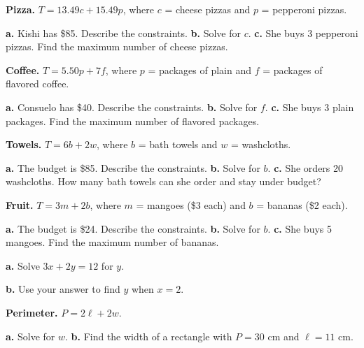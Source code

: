 \documentclass[11pt,a4paper]{article}
\newenvironment{FRQGrid}{%
  \begin{tcbraster}[raster columns=2,raster equal height=rows,raster column skip=4mm,
    raster row skip=3mm]}{\end{tcbraster}}
\begin{document}
\begin{FRQGrid}
\begin{FRQ}[fontupper=\small,qsource={Textbook · p.\,120 Ex. 4},qlevel=2,lines=3,final={6 cheese/5 pepperoni max; $c=\frac{T-15.49p}{13.49}$; 2}]
  \textbf{Pizza.} $T=13.49c+15.49p$, where $c$ = cheese pizzas and $p$ = pepperoni pizzas.\par
  \textbf{a.} Kishi has \$85. Describe the constraints.\quad
  \textbf{b.} Solve for $c$.\quad
  \textbf{c.} She buys 3 pepperoni pizzas. Find the maximum number of cheese pizzas.
\end{FRQ}
\begin{FRQ}[fontupper=\small,qsource={Textbook · p.\,126 Ex. 23},qlevel=2,lines=3,final={7 plain/5 flavored max; $f=\frac{T-5.50p}{7}$; 3}]
  \textbf{Coffee.} $T=5.50p+7f$, where $p$ = packages of plain and $f$ = packages of flavored coffee.\par
  \textbf{a.} Consuelo has \$40. Describe the constraints.\quad
  \textbf{b.} Solve for $f$.\quad
  \textbf{c.} She buys 3 plain packages. Find the maximum number of flavored packages.
\end{FRQ}
\begin{FRQ}[fontupper=\small,qsource={Textbook · p.\,126 Ex. 24},qlevel=2,lines=3,final={14 towels/42 washcloths max; $b=\frac{T-2w}{6}$; 7}]
  \textbf{Towels.} $T=6b+2w$, where $b$ = bath towels and $w$ = washcloths.\par
  \textbf{a.} The budget is \$85. Describe the constraints.\quad
  \textbf{b.} Solve for $b$.\quad
  \textbf{c.} She orders 20 washcloths. How many bath towels can she order and stay under budget?
\end{FRQ}
\begin{FRQ}[fontupper=\small,qlevel=2,lines=3,final={8 mangoes/12 bananas max; $b=\frac{T-3m}{2}$; 4}]
  \textbf{Fruit.} $T=3m+2b$, where $m$ = mangoes (\$3 each) and $b$ = bananas (\$2 each).\par
  \textbf{a.} The budget is \$24. Describe the constraints.\quad
  \textbf{b.} Solve for $b$.\quad
  \textbf{c.} She buys 5 mangoes. Find the maximum number of bananas.
\end{FRQ}
\begin{FRQ}[fontupper=\small,qlevel=1,lines=3,final={$y=\frac{12-3x}{2}$; $y=3$}]
  \textbf{a.} Solve $3x+2y=12$ for $y$.\par
  \textbf{b.} Use your answer to find $y$ when $x=2$.
\end{FRQ}
\begin{FRQ}[fontupper=\small,qlevel=3,lines=3,final={$w=\frac{P-2\ell}{2}$; $w=4$ cm}]
  \textbf{Perimeter.} $P=2\ell+2w$.\par
  \textbf{a.} Solve for $w$.\quad
  \textbf{b.} Find the width of a rectangle with $P=30$ cm and $\ell=11$ cm.
\end{FRQ}
\end{FRQGrid}
\end{document}
